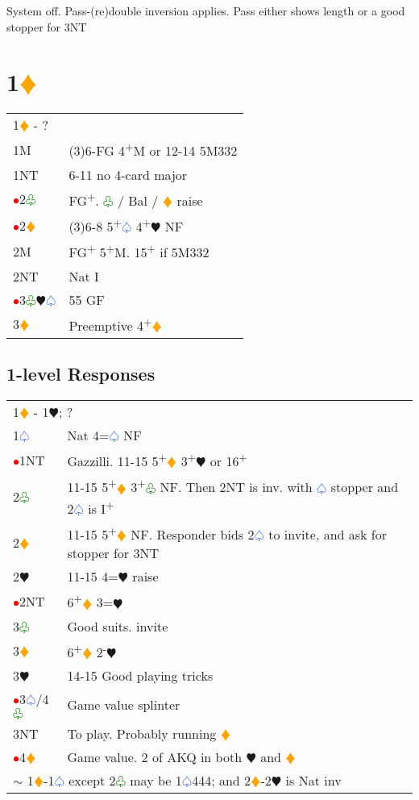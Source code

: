 \documentclass{article}
\renewcommand{\sp}{\textcolor{RoyalBlue}{$\varspade$}}
\newcommand{\he}{\textcolor{RubineRed}{$\varheart$}}
\newcommand{\di}{\textcolor{Orange}{$\vardiamond$}}
\newcommand{\cl}{\textcolor{Green}{$\varclub$}}
\newcommand{\nt}{\relsize{-1}NT\relsize{1}}
\newcommand{\up}{\textsuperscript{+}}
\newcommand{\down}{\textsuperscript{-}}
\newcommand{\al}{\textcolor{red}{$\bullet$}}
\begin{document}
System off. Pass-(re)double inversion applies. Pass either shows length or a good stopper for 3\nt{}

\section{1\di{}}

\begin{tabular}{|l|p{6.5cm}}
	\multicolumn{2}{l}{1\di{} - ?}\\
		1M & (3)6-FG 4\up{}M or 12-14 5M332 \\
		1\nt & 6-11 no 4-card major \\
		\al{}2\cl{} & FG\up{}. \cl{} / Bal / \di{} raise \\
		\al{}2\di{} & (3)6-8 5\up{}\sp{} 4\up{}\he{} NF \\
		2M & FG\up{} 5\up{}M. 15\up{} if 5M332 \\
		2\nt & Nat I \\
		\al{}3\cl{}\he{}\sp{} & 55 GF \\
		3\di{} & Preemptive 4\up\di{} \\
\end{tabular}

\subsection{1-level Responses}

\begin{tabular}{|l|p{6.5cm}}
	\multicolumn{2}{l}{1\di{} - 1\he{}; ?}\\
	1\sp{} & Nat 4=\sp{} NF \\
	\al{}1\nt & Gazzilli. 11-15 5\up{}\di{} 3\up{}\he{} or 16\up{}\\
	2\cl{} & 11-15 5\up\di{} 3\up\cl{} NF. Then 2\nt{} is inv. with \sp{} stopper and 2\sp{} is I\up{} \\
	2\di{} & 11-15 5\up\di{} NF. Responder bids 2\sp{} to invite, and ask for stopper for 3\nt \\
	2\he{}& 11-15 4=\he{} raise \\
	\al{}2\nt &  6\up{}\di{} 3={}\he{} \\
	3\cl{} & Good suits. invite \\
	3\di{} & 6\up{}\di{} 2\down{}\he{} \\
	3\he{} & 14-15 Good playing tricks \\
	\al{}3\sp{}/4\cl{} & Game value splinter \\
	3\nt{} & To play. Probably running \di{} \\
	\al{}4\di{} & Game value. 2 of AKQ in both \he{} and \di{} \\
	\multicolumn{2}{l}{$\sim$ 1\di{}-1\sp{} except 2\cl{} may be 1\sp{}444; and 2\di{}-2\he{} is Nat inv}
\end{tabular}
\end{document}
